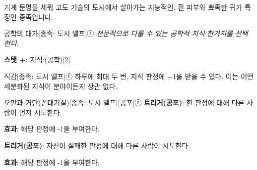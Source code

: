 \documentclass{report}
\begin{document}
	기계 문명을 세워 고도 기술의 도시에서 살아가는 지능적인, 흰 피부와 뾰족한 귀가 특징인 종족입니다.
	
	\begin{story}{공학의 대가}{[종족: 도시 엘프]ⓣ}
		\textit{전문적으로 다룰 수 있는 공학적 지식 한가지를 선택한다.}
		
		\textbf{스탯 +}: 지식:(공학)[2]
		
	\end{story}
	
	\begin{story}{직감}{[종족: 도시 엘프]ⓣ}
		하루에 최대 두 번, 지식 판정에 +1을 받을 수 있다. 이는 어떤 세분화된 지식이 분야이든지 상관 없다.
		
	\end{story}
	
	\begin{story}{오만과 거만(꼰대기질)}{[종족: 도시 엘프][공포]ⓣ}
		\textbf{트리거(공포)}: 한 판정에 대해 다른 사람이 먼저 시도한다.
		
		\textbf{효과}: 해당 판정에 -1을 부여한다.
		
		\medskip
		
		\textbf{트리거(공포)}: 자신이 실패한 판정에 대해 다른 사람이 시도한다.
		
		\textbf{효과}: 해당 판정에 -1을 부여한다.
		
	\end{story}
\end{document}
